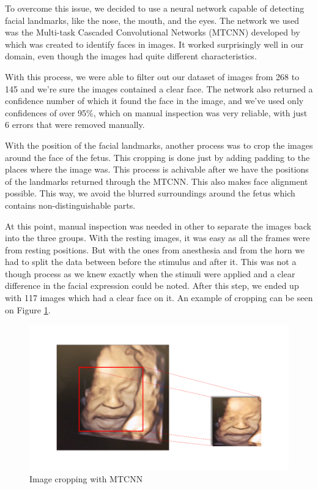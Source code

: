 To overcome this issue, we decided to use a neural network capable of detecting facial landmarks, like the nose, the mouth, and the eyes. The network we used was the Multi-task Cascaded Convolutional Networks (MTCNN) developed by \cite{ZhangZL016} which was created to identify faces in images. It worked surprisingly well in our domain, even though the images had quite different characteristics.

With this process, we were able to filter out our dataset of images from 268 to 145 and we're sure the images contained a clear face. The network also returned a confidence number of which it found the face in the image, and we've used only confidences of over 95\%, which on manual inspection was very reliable, with just 6 errors that were removed manually.

With the position of the facial landmarks, another process was to crop the images around the face of the fetus. This cropping is done just by adding padding to the places where the image was. This process is achivable after we have the positions of the landmarks returned through the MTCNN. This also makes face alignment possible. This way, we avoid the blurred surroundings around the fetus which contains non-distinguishable parts. 

At this point, manual inspection was needed in other to separate the images back into the three groups. With the resting images, it was easy as all the frames were from resting positions. But with the ones from anesthesia and from the horn we had to split the data between before the stimulus and after it. This was not a though process as we knew exactly when the stimuli were applied and a clear difference in the facial expression could be noted. After this step, we ended up with 117 images which had a clear face on it. An example of cropping can be seen on Figure \ref{fig:cropping}.

\begin{figure}[h!tp]
    \centering
    \includegraphics[width=.9\textwidth]{imgs/chap3_cropping.png}
    \caption{Image cropping with MTCNN}
    \label{fig:cropping}
\end{figure}

